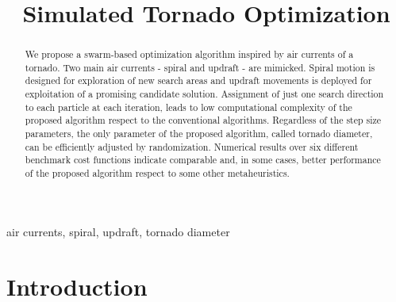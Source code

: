 \documentclass[conference]{IEEEtran}
\begin{document}
\title{Simulated Tornado Optimization}
\author{
}

\IEEEoverridecommandlockouts
\IEEEpubid{}


\maketitle

\begin{abstract}
We propose a swarm-based optimization algorithm inspired by air currents of a tornado. Two main air currents - spiral and updraft - are mimicked. Spiral motion is designed for exploration of new search areas and updraft movements is deployed for exploitation of a promising candidate solution. Assignment of just one search direction to each particle at each iteration, leads to low computational complexity of the proposed algorithm respect to the conventional algorithms. Regardless of the step size parameters, the only parameter of the proposed algorithm, called tornado diameter, can be efficiently adjusted by randomization. Numerical results over six different benchmark cost functions indicate comparable and, in some cases, better  performance of the proposed algorithm respect to some other metaheuristics.
\end{abstract}

\begin{IEEEkeywords}
air currents, spiral, updraft, tornado diameter
\end{IEEEkeywords}

\IEEEpeerreviewmaketitle


\section{Introduction}
\end{document}
